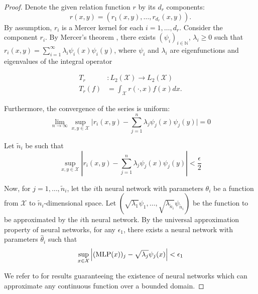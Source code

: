 \begin{proof}
	\hphantom{~}

	Denote the given relation function \(r\) by its \(d_r\) components:
	\begin{equation}
		r(x,y) = (r_1(x,y), \ldots, r_{d_r}(x,y)).
	\end{equation}
	By assumption, \(r_i\) is a Mercer kernel for each \(i = 1, \ldots, d_r\). Consider the component \(r_i\). By Mercer's theorem \citep{mercerFunctionsPositive1909, sunMercerTheorem2005, universal}, there exists \((\psi_i)_{i \in \mathbb{N}}\), \(\lambda_i \geq 0\) such that \(r_i(x,y) = \sum_{i=1}^{\infty}{\lambda_i \psi_i(x) \psi_i(y)}\), where \(\psi_i\) and \(\lambda_i\) are eigenfunctions and eigenvalues of the integral operator

	\begin{align*}
		T_r&: L_2(\mathcal{X}) \to L_2(\mathcal{X}) \\
		T_r(f) &= \int_{\mathcal{X}}{r(\cdot, x) f(x) dx}.
	\end{align*}

	Furthermore, the convergence of the series is uniform:
	\begin{equation}
		\lim_{n \to \infty} \sup_{x,y \in \mathcal{X}} \lvert r_i(x,y) - \sum_{j=1}^{n}{\lambda_j \psi_j(x) \psi_j(y) \rvert} = 0
	\end{equation}

	Let \(\tilde{n}_i\) be such that
	\begin{equation}
		\label{eq:proof_mercer_thm_unif_abs_cv}
		\sup_{x,y \in \mathcal{X}} \left\lvert r_i(x,y) - \sum_{j=1}^{n}{\lambda_j \psi_j(x) \psi_j(y)} \right\rvert < \frac{\epsilon}{2}
	\end{equation}

	Now, for \(j = 1, \ldots, \tilde{n}_i\), let the \(i\)th neural network with parameters \(\theta_i\) be a function from \(\mathcal{X}\) to \(\tilde{n}_i\)-dimensional space. Let \((\sqrt{\lambda_1} \psi_1, \ldots, \sqrt{\lambda_{\tilde{n}_i}} \psi_{\tilde{n}_i})\) be the function to be approximated by the \(i\)th neural network. By the universal approximation property of neural networks, for any \(\epsilon_1\), there exists a neural network with parameters \(\hat{\theta}_i\) such that
	\begin{equation}
		\label{eq:proof_NN_UAP}
		\sup_{x\in \mathcal{X}}{\left\lvert (\MLP(x))_j - \sqrt{\lambda_j} \psi_j(x) \right\lvert } < \epsilon_1
	\end{equation}

	We refer to \citep{hornikMultilayerFeedforward1989, cybenkoApproximationSuperpositions1989, barronUniversalApproximation1993} for results guaranteeing the existence of neural networks which can approximate any continuous function over a bounded domain.


\end{proof}

